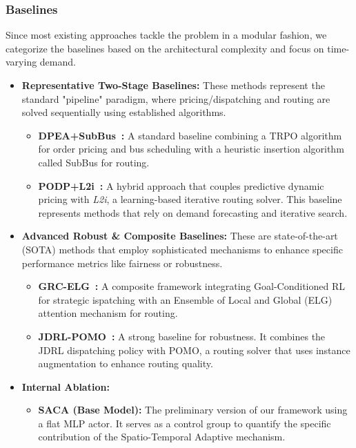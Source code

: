 \documentclass[lettersize,journal]{IEEEtran}
\begin{document}
\subsubsection{Baselines}
Since most existing approaches tackle the problem in a modular fashion, we categorize the baselines based on the architectural complexity and focus on time-varying demand.

\begin{itemize}
    \item \textbf{Representative Two-Stage Baselines:} These methods represent the standard "pipeline" paradigm, where pricing/dispatching and routing are solved sequentially using established algorithms.
    \begin{itemize}
        \item \textbf{DPEA+SubBus~\cite{ref:DPEA, ref_shared_subway}:} A standard baseline combining a TRPO algorithm for order pricing and bus scheduling with a heuristic insertion algorithm called SubBus for routing.
        \item \textbf{PODP+L2i~\cite{ref:PODP, ref:L2i}:} A hybrid approach that couples predictive dynamic pricing with \textit{L2i}, a learning-based iterative routing solver. This baseline represents methods that rely on demand forecasting and iterative search.
    \end{itemize}
    
    \item \textbf{Advanced Robust \& Composite Baselines:} These are state-of-the-art (SOTA) methods that employ sophisticated mechanisms to enhance specific performance metrics like fairness or robustness.
    \begin{itemize}
        \item \textbf{GRC-ELG~\cite{ref:Lei2023}:} A composite framework integrating Goal-Conditioned RL for strategic ispatching with an Ensemble of Local and Global (ELG) attention mechanism for routing.
        \item \textbf{JDRL-POMO~\cite{ref:Sun2022KDD, ref:KwonPOMO2020}:} A strong baseline for robustness. It combines the JDRL dispatching policy with POMO, a routing solver that uses instance augmentation to enhance routing quality.
    \end{itemize}

    \item \textbf{Internal Ablation:}
    \begin{itemize}
        \item \textbf{SACA (Base Model):} The preliminary version of our framework using a flat MLP actor. It serves as a control group to quantify the specific contribution of the Spatio-Temporal Adaptive mechanism.
    \end{itemize}
\end{itemize}
\end{document}
